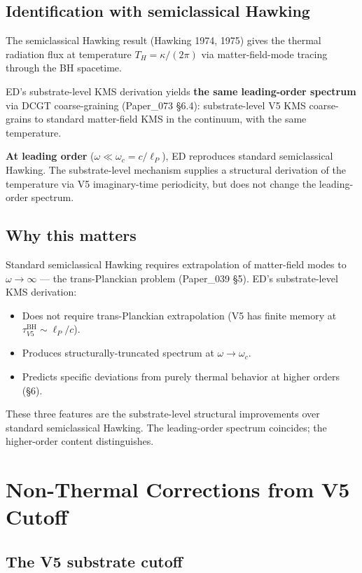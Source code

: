 \documentclass[11pt,a4paper]{article}
\begin{document}
\subsection{Identification with semiclassical Hawking}

The semiclassical Hawking result (Hawking 1974, 1975) gives the thermal radiation flux at temperature $T_H = \kappa/(2\pi)$ via matter-field-mode tracing through the BH spacetime.

ED's substrate-level KMS derivation yields \textbf{the same leading-order spectrum} via DCGT coarse-graining (Paper\_073 \S6.4): substrate-level V5 KMS coarse-grains to standard matter-field KMS in the continuum, with the same temperature.

\textbf{At leading order} ($\omega \ll \omega_c = c/\ell_P$), ED reproduces standard semiclassical Hawking. The substrate-level mechanism supplies a structural derivation of the temperature via V5 imaginary-time periodicity, but does not change the leading-order spectrum.

\subsection{Why this matters}

Standard semiclassical Hawking requires extrapolation of matter-field modes to $\omega \to \infty$ --- the trans-Planckian problem (Paper\_039 \S5). ED's substrate-level KMS derivation:

\begin{itemize}[noitemsep]
\item Does not require trans-Planckian extrapolation (V5 has finite memory at $\tau_{V5}^\mathrm{BH} \sim \ell_P/c$).
\item Produces structurally-truncated spectrum at $\omega \to \omega_c$.
\item Predicts specific deviations from purely thermal behavior at higher orders (\S6).
\end{itemize}

These three features are the substrate-level structural improvements over standard semiclassical Hawking. The leading-order spectrum coincides; the higher-order content distinguishes.

\section{Non-Thermal Corrections from V5 Cutoff}

\subsection{The V5 substrate cutoff}
\end{document}
